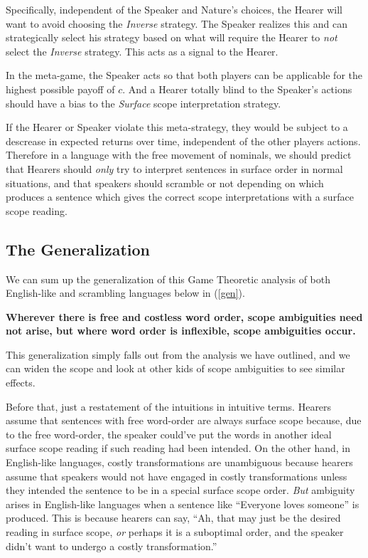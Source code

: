 \documentclass{article}
\begin{document}
Specifically, independent of the Speaker and Nature's choices, the Hearer will want to avoid choosing the \emph{Inverse} strategy. The Speaker realizes this and can strategically select his strategy based on what will require the Hearer to \emph{not} select the \emph{Inverse} strategy. This acts as a signal to the Hearer.

In the meta-game, the Speaker acts so that both players can be applicable for the highest possible payoff of $c$. And a Hearer totally blind to the Speaker's actions should have a bias to the \emph{Surface} scope interpretation strategy.

If the Hearer or Speaker violate this meta-strategy, they would be subject to a descrease in expected returns over time, independent of the other players actions. Therefore in a language with the free movement of nominals, we should predict that Hearers should \emph{only} try to interpret sentences in surface order in normal situations, and that speakers should scramble or not depending on which produces a sentence which gives the correct scope interpretations with a surface scope reading.


\subsection{The Generalization}


We can sum up the generalization of this Game Theoretic analysis of both English-like and scrambling languages below in (\ref{gen}).

\begin{exe}
\ex \textbf{Wherever there is free and costless word order, scope ambiguities need not arise, but where word order is inflexible, scope ambiguities occur.
\label{gen}}
\end{exe}

This generalization simply falls out from the analysis we have outlined, and we can widen the scope and look at other kids of scope ambiguities to see similar effects.

Before that, just a restatement of the intuitions in intuitive terms. Hearers assume that sentences with free word-order are always surface scope because, due to the free word-order, the speaker could've put the words in another ideal surface scope reading if such reading had been intended. On the other hand, in English-like languages, costly transformations are unambiguous because hearers assume that speakers would not have engaged in costly transformations unless they intended the sentence to be in a special surface scope order. \emph{But} ambiguity arises in English-like languages when a sentence like ``Everyone loves someone'' is produced. This is because hearers can say, ``Ah, that may just be the desired reading in surface scope, \emph{or} perhaps it is a suboptimal order, and the speaker didn't want to undergo a costly transformation.''
\end{document}
